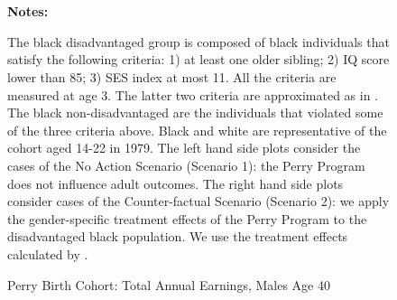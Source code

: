 \begin{figure} \begin{center}\centering
        \caption{Perry Birth Cohort: Total Annual Earnings, Males Age 40}
        \label{male_earn_decile2}\vspace{0.2cm}

          \\
          \\ 
\end{center}
{\scriptsize {\bfseries Notes: } \raggedright The black disadvantaged group is composed of black individuals that satisfy the following criteria: 1) at least one older sibling; 2) IQ score lower than 85; 3) SES index at most 11. All the criteria are measured at age 3. The latter two criteria are approximated as in \citet{heckman2010analyzing}. The black non-disadvantaged are the individuals that violated some of the three criteria above. Black and white are representative of the cohort aged 14-22 in 1979. The left hand side plots consider the cases of the No Action Scenario (Scenario 1): the Perry Program does not influence adult outcomes. The right hand side plots consider cases of the Counter-factual Scenario (Scenario 2): we apply the gender-specific treatment effects of the Perry Program to the disadvantaged black population. We use the treatment effects calculated by \citet{heckman2010analyzing}. 
}
\end{figure}

